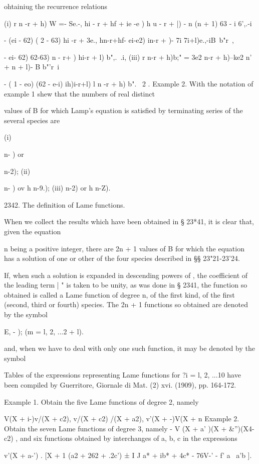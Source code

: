 {{{{ohtainiug the recurrence relations

(i) r n -r + h) W =- Se.-, hi - r + hf + ie -e ) h u - r + |) - n (n +
1) 63 - i 6',.-i

- (ei - 62) ( 2 - 63) hi -r + %
3e., hn-r+hf- ei-e2) in-r + )- 7i 7i+l)e.,-iB\ b"r\ ,

- ei- 62) 62-63) n - r+ ) hi-r + l) b",.\ .i, (iii) r n-r + h)b;" =
3e2 n-r + h)--ke2 n' + n + l)- B b"'r\ i

- ( 1 - eo) (62 - e-i) ih)i-r+l) l n -r + h) b". \ 2 . Example 2. With
the notation of example 1 shew that the numbers of real distinct

values of B for which Lamp's equation is satisfied by terminating
series of the several species are

(i) \ \ {n- ) or \ \ {n-2); (ii) \ \ {n- ) ov h n-9.); (iii) n-2) or h
n-Z).

2342. The definition of Lame functions.

When we collect the results which have been obtained in § 23*41, it is
clear that, given the equation

n being a positive integer, there are 2n + 1 values of B for which the
equation has a solution of one or other of the four species described
in §§ 23"21-23'24.

If, when such a solution is expanded in descending powers of , the
coefficient of the leading term | " is taken to be unity, as was done
in § 2341, the function so obtained is called a Lame function of
degree n, of the first kind, of the first (second, third or fourth)
species. The 2n + 1 functions so obtained are denoted by the symbol

E, - ); (m = l, 2, ...2 + l).

and, when we have to deal with only one such function, it may be
denoted by the symbol

Tables of the expressions representing Lame functions for ?i = l, 2,
...10 have been compiled by Guerritore, Giornale di Mat. (2) xvi.
(1909), pp. 164-172.

Example 1. Obtain the five Lame functions of degree 2, namely

V(X + i-)v/(X + c2), v/(X + c2) /(X + a2), v'(X + -)V(X + n Example 2.
Obtain the seven Lame functions of degree 3, namely - V (X + a' )(X +
\&'')(X4-c2) , and six functions obtained by interchanges of a, b, c
in the expressions

v'(X + a-') . [X + 1 (a2 + 262 + .2c') ± I J a* + ib* + 4c* - 76V-' -
f' a \ a'b ].

}}}}}}}
